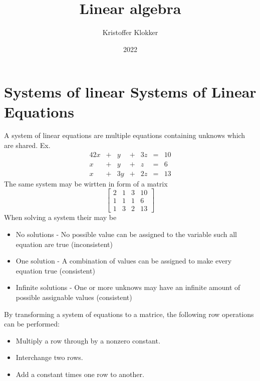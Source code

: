 \documentclass[12pt, a4paper]{article}
\title{Linear algebra}
\date{2022}
\author{Kristoffer Klokker}
\begin{document}
	\maketitle
	\clearpage
	\tableofcontents
	\clearpage
	\section{Systems of linear Systems of Linear Equations}
		A system of linear equations are multiple equations containing unknows which are shared. Ex.
		\begin{alignat*}{4}
		   2x & {}+{} &  y & {}+{} & 3z & {}={} & 10 \\
		    x & {}+{} &  y & {}+{} &  z & {}={} &  6 \\
		    x & {}+{} & 3y & {}+{} & 2z & {}={} & 13
		\end{alignat*}
		The same system may be wirtten in form of a matrix\\
		$$\begin{bmatrix}
			2 & 1 & 3 & 10\\
			1 & 1 & 1 & 6\\
			1 & 3 & 2 & 13
		\end{bmatrix}$$
		When solving a system their may be
		\begin{itemize}
			\item No solutions - No possible value can be assigned to the variable such all equation are true (inconsistent)
			\item One solution - A combination of values can be assigned to make every equation true (consistent)
			\item Infinite solutions - One or more unknows may have an infinite amount of possible assignable values (consistent)
		\end{itemize}
		By transforming a system of equations to a matrice, the following row operations can be performed:
		\begin{itemize}
			\item Multiply a row through by a nonzero constant.
			\item Interchange two rows.
			\item Add a constant times one row to another.
		\end{itemize}
\end{document}
